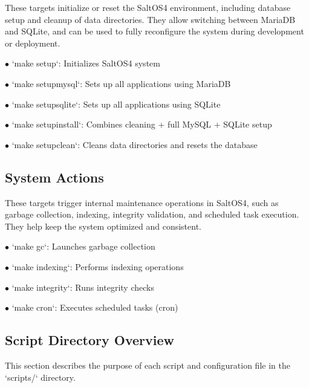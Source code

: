 \documentclass[a4paper]{article}
\begin{document}
These targets initialize or reset the SaltOS4 environment, including database setup and cleanup of data directories. They allow switching between MariaDB and SQLite, and can be used to fully reconfigure the system during development or deployment.

\begin{compactitem}
\item[\color{myblue}$\bullet$] `make setup`: Initializes SaltOS4 system
\item[\color{myblue}$\bullet$] `make setupmysql`: Sets up all applications using MariaDB
\item[\color{myblue}$\bullet$] `make setupsqlite`: Sets up all applications using SQLite
\item[\color{myblue}$\bullet$] `make setupinstall`: Combines cleaning + full MySQL + SQLite setup
\item[\color{myblue}$\bullet$] `make setupclean`: Cleans data directories and resets the database
\end{compactitem}

\hypertarget{toc66}{}
\subsection{System Actions}

These targets trigger internal maintenance operations in SaltOS4, such as garbage collection, indexing, integrity validation, and scheduled task execution. They help keep the system optimized and consistent.

\begin{compactitem}
\item[\color{myblue}$\bullet$] `make gc`: Launches garbage collection
\item[\color{myblue}$\bullet$] `make indexing`: Performs indexing operations
\item[\color{myblue}$\bullet$] `make integrity`: Runs integrity checks
\item[\color{myblue}$\bullet$] `make cron`: Executes scheduled tasks (cron)
\end{compactitem}

\hypertarget{toc67}{}
\subsection{Script Directory Overview}

This section describes the purpose of each script and configuration file in the `scripts/` directory.
\end{document}
